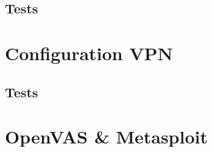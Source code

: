 \documentclass[a4paper]{article}
\begin{document}
\subsection{Tests}

\section{Configuration VPN}
\subsection{Tests}

\section{OpenVAS \& Metasploit}
\end{document}
